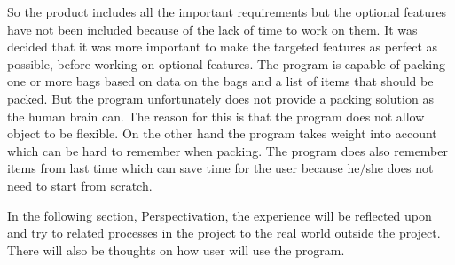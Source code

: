 So the product includes all the important requirements but the optional features have not been included because of the lack of time to work on them. It was decided that it was more important to make the targeted features as perfect as possible, before working on optional features. The program is capable of packing one or more bags based on data on the bags and a list of items that should be packed. But the program unfortunately does not provide a packing solution as the human brain can. The reason for this is that the program does not allow object to be flexible. On the other hand the program takes weight into account which can be hard to remember when packing. The program does also remember items from last time which can save time for the user because he/she does not need to start from scratch.

In the following section, Perspectivation, the experience will be reflected upon and try to related processes in the project to the real world outside the project. There will also be thoughts on how user will use the program.